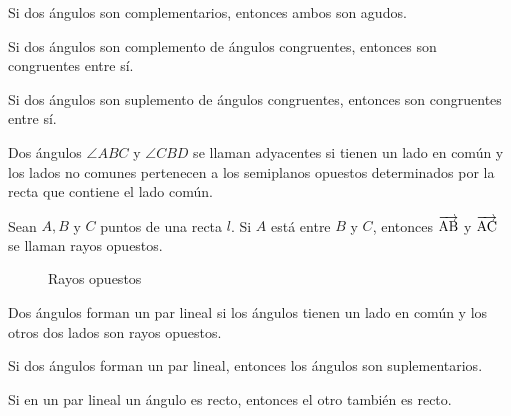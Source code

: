 \begin{theorem}
    Si dos ángulos son complementarios, entonces ambos son agudos.
\end{theorem}

\begin{theorem}
    Si dos ángulos son complemento de ángulos congruentes, entonces son congruentes entre sí.
\end{theorem}

\begin{theorem}
    Si dos ángulos son suplemento de ángulos congruentes, entonces son congruentes entre sí.
\end{theorem}

\begin{definition}
    Dos ángulos $\angle{ABC}$ y $\angle{CBD}$ se llaman adyacentes si tienen un lado en común y los lados no comunes pertenecen a los semiplanos opuestos determinados por la recta que contiene el lado común.
\end{definition}

\begin{definition}
    Sean $A,B$ y $C$ puntos de una recta $l$. Si $A$ está entre $B$ y $C$, entonces $\overrightarrow{\rm AB}$ y $\overrightarrow{\rm AC}$ se llaman rayos opuestos.

    \begin{figure}[!h]
        \centering
        
        \caption{Rayos opuestos}
        \label{fig:oposing-rays}
    \end{figure}
    
\end{definition}

\clearpage

\begin{definition}
    Dos ángulos forman un par lineal si los ángulos tienen un lado en común y los otros dos lados son rayos opuestos.

\end{definition}

\begin{postulate}
    Si dos ángulos forman un par lineal, entonces los ángulos son suplementarios.
\end{postulate}

\begin{theorem}
    Si en un par lineal un ángulo es recto, entonces el otro también es recto.
\end{theorem}

